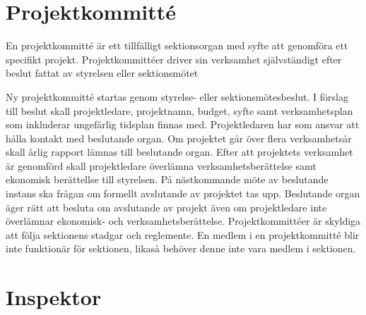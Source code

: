 \documentclass[stadgar]{dsekprotokoll}
\begin{document}
\section{Projektkommitté}

En projektkommitté är ett tillfälligt sektionsorgan med syfte att genomföra ett specifikt projekt. Projektkommittéer driver sin verksamhet självständigt efter beslut fattat av styrelsen eller sektionsmötet
\begin{stadgeavsnitt}
Ny projektkommitté startas genom styrelse- eller sektionsmötesbeslut. I förslag till beslut skall projektledare, projektnamn, budget, syfte samt verksamhetsplan som inkluderar ungefärlig tidsplan finnas med.
 Projektledaren har som ansvar att hålla kontakt med beslutande organ.
Om projektet går över flera verksamhetsår skall årlig rapport lämnas till beslutande organ.
Efter att projektets verksamhet är genomförd skall projektledare överlämna verksamhetsberättelse samt ekonomisk berättellse till styrelsen. På nästkommande möte av beslutande instans ska frågan om formellt avslutande av projektet tas upp. Beslutande organ äger rätt att besluta om avslutande av projekt även om projektledare inte överlämnar ekonomisk- och verksamhetsberättelse.
 Projektkommittéer är skyldiga att följa sektionens stadgar och reglemente.
En medlem i en projektkommitté blir inte funktionär för sektionen, likaså behöver denne inte vara medlem i sektionen.
\end{stadgeavsnitt}

\section{Inspektor}
\end{document}

